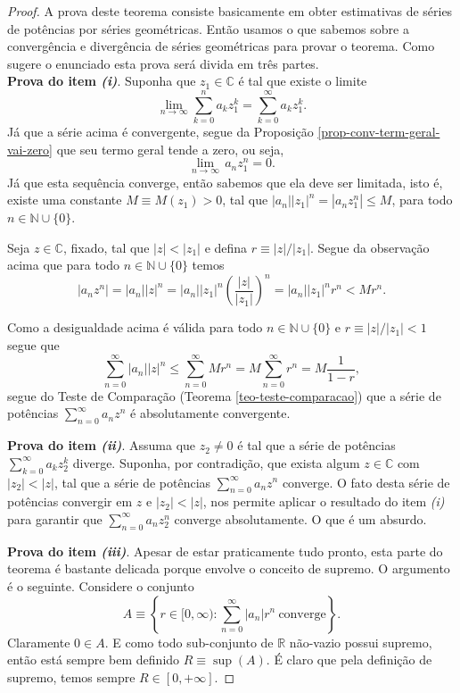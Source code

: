 \begin{proof}
A prova deste teorema consiste basicamente em obter
estimativas de séries de potências por séries geométricas. Então usamos
o que sabemos sobre a convergência e divergência 
de séries geométricas para provar o teorema. 
Como sugere o enunciado esta prova será divida em três partes.
\\

\noindent \textbf{Prova do item \textit{(i)}}. 
Suponha que $z_1\in\mathbb{C}$ é tal que existe o limite
\[
\lim_{n\to\infty} \sum_{k=0}^{n}a_kz_1^k = \sum_{k=0}^{\infty} a_kz_1^k.
\]
Já que a série acima é convergente, segue da 
Proposição \ref{prop-conv-term-geral-vai-zero} 
que seu termo geral tende a zero, ou seja, 
\[
\lim_{n\to \infty}\, a_nz_1^n = 0.
\]
Já que esta sequência converge, então sabemos que ela deve ser limitada, isto é,
existe uma constante $M\equiv M(z_1)>0$, tal que $|a_n||z_1|^n=|a_nz_1^n|\leqslant M$, 
para todo $n\in\mathbb{N}\cup\{0\}$.

Seja $z\in\mathbb{C}$, fixado, 
tal que $|z|<|z_1|$ e defina $r\equiv|z|/|z_1|$. Segue da observação 
acima que para todo $n\in\mathbb{N}\cup\{0\}$ temos
\[
|a_nz^n|
=
|a_n||z|^n
=
|a_n||z_1|^n \left(\frac{|z|}{|z_1|}\right)^n
= 
|a_n||z_1|^n r^n
< 
Mr^n.
\]

Como a desigualdade acima é válida para todo $n\in\mathbb{N}\cup\{0\}$ 
e $r\equiv|z|/|z_1|<1$ segue que
\[
\sum_{n=0}^{\infty} |a_n||z|^n
\leqslant 
\sum_{n=0}^{\infty} Mr^n
=
M\sum_{n=0}^{\infty} r^n
=
M\frac{1}{1-r},
\]
segue do Teste de Comparação (Teorema \ref{teo-teste-comparacao}) 
que a série de potências 
$\sum_{n=0}^{\infty} a_nz^n$
é absolutamente convergente.

\medskip 

\noindent \textbf{Prova do item \textit{(ii)}}. 
Assuma que $z_2\neq 0$ é tal que a série de potências 
$\sum_{k=0}^{\infty}a_kz_2^k$ diverge.
Suponha, por contradição, que exista algum $z\in\mathbb{C}$
com $|z_2|<|z|$, tal que a série de potências $\sum_{n=0}^{\infty} a_nz^n$
converge. O fato desta série de potências convergir em $z$
e $|z_2|<|z|$, nos permite aplicar o resultado do item \textit{(i)}
para garantir que $\sum_{n=0}^{\infty} a_nz_2^n$ converge absolutamente.
O que é um absurdo.



\medskip 

\noindent \textbf{Prova do item \textit{(iii)}}. 
Apesar de estar praticamente tudo pronto, esta parte do teorema 
é bastante delicada porque envolve o conceito de supremo. 
O argumento é o seguinte. 
Considere o conjunto 
\[
A
\equiv 
\left\{ r\in [0,\infty): \sum_{n=0}^{\infty} |a_n|r^n \ \text{converge}  \right\}.
\]
Claramente $0\in A$. E como todo sub-conjunto de $\mathbb{R}$ não-vazio possui
supremo, então está sempre bem definido $R\equiv \sup(A)$. 
É claro que pela definição de supremo, temos sempre $R\in [0,+\infty]$.  



\end{proof}
